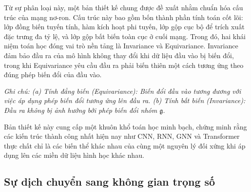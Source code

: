 Từ sự phân loại này, một bản thiết kế chung được đề xuất nhằm chuẩn hóa cấu trúc của mạng nơ-ron. Cấu trúc này bao gồm bốn thành phần tính toán cốt lõi: lớp đồng biến tuyến tính, hàm kích hoạt phi tuyến, lớp gộp cục bộ để trích xuất đặc trưng đa tỷ lệ, và lớp gộp bất biến toàn cục ở cuối mạng. Trong đó, hai khái niệm toán học đóng vai trò nền tảng là Invariance và Equivariance. Invariance đảm bảo đầu ra của mô hình không thay đổi khi dữ liệu đầu vào bị biến đổi, trong khi Equivariance yêu cầu đầu ra phải biến thiên một cách tương ứng theo đúng phép biến đổi của đầu vào.

\begin{center}
    
    \vspace{0.2cm}
    \label{fig:commutative-diagram}
\end{center}
\noindent\textit{Ghi chú: (a) Tính đẳng biến (Equivariance): Biến đổi đầu vào tương đương với việc áp dụng phép biến đổi tương ứng lên đầu ra. (b) Tính bất biến (Invariance): Đầu ra không bị ảnh hưởng bởi phép biến đổi nhóm $\mathfrak{g}$.}

Bản thiết kế này cung cấp một khuôn khổ toán học minh bạch, chứng minh rằng các kiến trúc thành công nhất hiện nay như CNN, RNN, GNN và Transformer thực chất chỉ là các biến thể khác nhau của cùng một nguyên lý đối xứng khi áp dụng lên các miền dữ liệu hình học khác nhau.

\subsection{Sự dịch chuyển sang không gian trọng số}
\label{subsec:su-dich-chuyen-khong-gian-trong-so}

